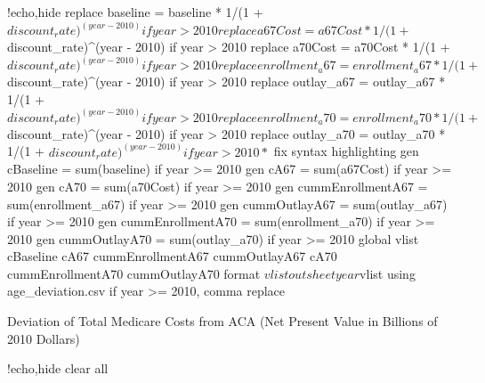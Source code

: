 \documentclass{article}
\begin{document}
\begin{Statacode}{!echo,hide}
replace baseline = baseline * 1/(1 + $discount_rate)^(year - 2010) if year > 2010
replace a67Cost = a67Cost * 1/(1 + $discount_rate)^(year - 2010) if year > 2010
replace a70Cost = a70Cost * 1/(1 + $discount_rate)^(year - 2010) if year > 2010
replace enrollment_a67 = enrollment_a67 * 1/(1 + $discount_rate)^(year - 2010) if year > 2010
replace outlay_a67 = outlay_a67 * 1/(1 + $discount_rate)^(year - 2010) if year > 2010
replace enrollment_a70 = enrollment_a70 * 1/(1 + $discount_rate)^(year - 2010) if year > 2010
replace outlay_a70 = outlay_a70 * 1/(1 + $discount_rate)^(year - 2010) if year > 2010
* $ fix syntax highlighting
gen cBaseline = sum(baseline) if year >= 2010
gen cA67 = sum(a67Cost) if year >= 2010
gen cA70 = sum(a70Cost) if year >= 2010
gen cummEnrollmentA67 = sum(enrollment_a67) if year >= 2010
gen cummOutlayA67 = sum(outlay_a67) if year >= 2010
gen cummEnrollmentA70 = sum(enrollment_a70) if year >= 2010
gen cummOutlayA70 = sum(outlay_a70) if year >= 2010
global vlist cBaseline cA67 cummEnrollmentA67 cummOutlayA67 cA70 cummEnrollmentA70 cummOutlayA70
format $vlist %
outsheet year $vlist using age_deviation.csv if year >= 2010, comma replace
\end{Statacode}


\begin{table}[ht]
\centering
\caption{Deviation of Total Medicare Costs from ACA (Net Present Value in Billions of 2010 Dollars)}
\label{tab:age_deviation}
\end{table}

\begin{Statacode}{!echo,hide}
clear all
\end{Statacode}
\end{document}
